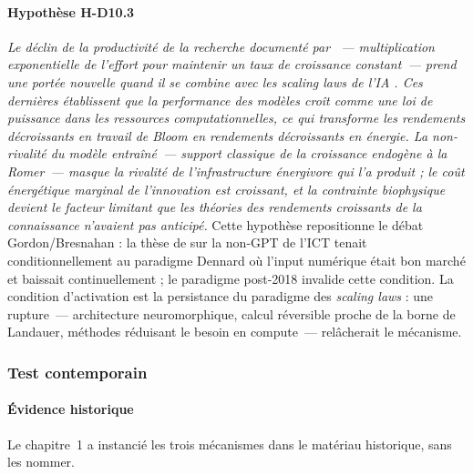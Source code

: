 \paragraph{Hypothèse H-D10.3} \emph{Le déclin de la productivité de la recherche documenté par \textcite{bloom_ideas_2020}~--- multiplication exponentielle de l'effort pour maintenir un taux de croissance constant~--- prend une portée nouvelle quand il se combine avec les \emph{scaling laws} de l'IA \parencite{kaplan_scaling_2020,hoffmann_training_2022}. Ces dernières établissent que la performance des modèles croît comme une loi de puissance dans les ressources computationnelles, ce qui transforme les rendements décroissants en travail de Bloom en rendements décroissants en énergie. La non-rivalité du modèle entraîné~--- support classique de la croissance endogène à la Romer~--- masque la rivalité de l'infrastructure énergivore qui l'a produit ; le coût énergétique marginal de l'innovation est croissant, et la contrainte biophysique devient le facteur limitant que les théories des rendements croissants de la connaissance n'avaient pas anticipé.} Cette hypothèse repositionne le débat Gordon/Bresnahan : la thèse de \textcite{gordon_does_2000} sur la non-GPT de l'ICT tenait conditionnellement au paradigme Dennard où l'input numérique était bon marché et baissait continuellement ; le paradigme post-2018 invalide cette condition. La condition d'activation est la persistance du paradigme des \emph{scaling laws} : une rupture~--- architecture neuromorphique, calcul réversible proche de la borne de Landauer, méthodes réduisant le besoin en compute~--- relâcherait le mécanisme.


\subsubsection{Test contemporain}


\paragraph{Évidence historique}

Le chapitre~1 a instancié les trois mécanismes dans le matériau historique, sans les nommer.

